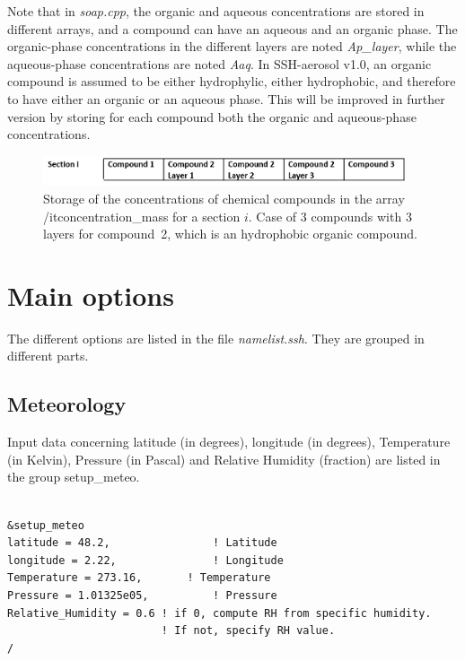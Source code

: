 \documentclass[a4paper,11pt]{article}
\begin{document}
Note that in \textit{soap.cpp}, the organic and aqueous concentrations are stored in different arrays, and a compound can have an aqueous and an organic phase. The organic-phase concentrations in the different layers are
noted \textit{Ap\_layer}, while the aqueous-phase concentrations  are
noted \textit{Aaq}. 
In SSH-aerosol v1.0, an organic compound is assumed to be either hydrophylic,
either hydrophobic, and therefore to have either an organic or an aqueous phase. This will be improved in further version by storing for
each compound both the organic and aqueous-phase concentrations.

\begin{figure}[H]
        \begin{center}
                \includegraphics[angle=0,width=0.95\textwidth]{array.png}
        \end{center}
\caption{Storage of the concentrations of chemical compounds in the array {/it{concentration\_mass}} for a section $i$. Case of 3 compounds with 3 layers for compound~2, which is an hydrophobic organic compound.}
\label{fig-array}
\end{figure}

\section{Main options}

The different options are listed in the file {\textit{namelist.ssh}}. They are grouped in different parts.

\subsection{Meteorology}

Input data concerning latitude (in degrees), longitude (in degrees), Temperature (in Kelvin), Pressure (in Pascal) and Relative Humidity (fraction) are listed in the group setup\_meteo. 

\begin{verbatim}

&setup_meteo
latitude = 48.2,                ! Latitude
longitude = 2.22,               ! Longitude
Temperature = 273.16,    	! Temperature
Pressure = 1.01325e05,         	! Pressure
Relative_Humidity = 0.6	! if 0, compute RH from specific humidity. 
                        ! If not, specify RH value.
/

\end{verbatim}
\end{document}
